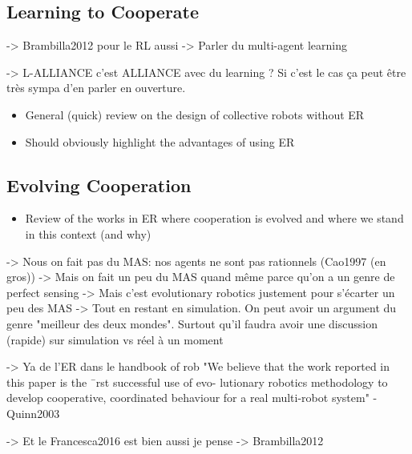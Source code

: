   \subsection{Learning to Cooperate}

    -> Brambilla2012 pour le RL aussi
    -> Parler du multi-agent learning

    -> L-ALLIANCE c'est ALLIANCE avec du learning ? Si c'est le cas ça peut être très sympa d'en parler en ouverture.

    \begin{itemize}
      \item{General (quick) review on the design of collective robots without ER}
      \item{Should obviously highlight the advantages of using ER}
    \end{itemize}

  \subsection{Evolving Cooperation}
    \begin{itemize}
      \item{Review of the works in ER where cooperation is evolved and where we stand in this context (and why)}
    \end{itemize}

    -> Nous on fait pas du MAS: nos agents ne sont pas rationnels (Cao1997 (en gros))
          -> Mais on fait un peu du MAS quand même parce qu'on a un genre de perfect sensing
          -> Mais c'est evolutionary robotics justement pour s'écarter un peu des MAS
          -> Tout en restant en simulation. On peut avoir un argument du genre "meilleur des deux mondes". Surtout qu'il faudra avoir une discussion (rapide) sur simulation vs réel à un moment


    -> Ya de l'ER dans le handbook of rob
    "We believe that the work reported in this paper is the ¯rst successful use of evo- lutionary robotics methodology to develop cooperative, coordinated behaviour for a real multi-robot system" - Quinn2003

    -> Et le Francesca2016 est bien aussi je pense
    -> Brambilla2012



